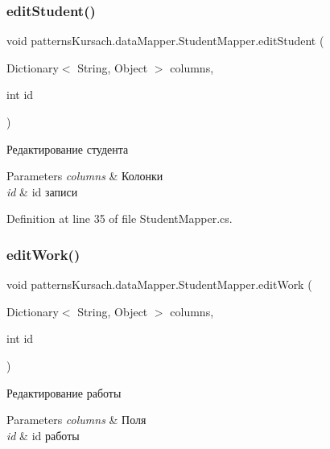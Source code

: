 \subsubsection{\texorpdfstring{edit\+Student()}{editStudent()}}
{\footnotesize\ttfamily void patterns\+Kursach.\+data\+Mapper.\+Student\+Mapper.\+edit\+Student (\begin{DoxyParamCaption}\item[{Dictionary$<$ String, Object $>$}]{columns,  }\item[{int}]{id }\end{DoxyParamCaption})}



Редактирование студента 


\begin{DoxyParams}{Parameters}
{\em columns} & Колонки\\
\hline
{\em id} & id записи\\
\hline
\end{DoxyParams}


Definition at line 35 of file Student\+Mapper.\+cs.

\mbox{\label{classpatterns_kursach_1_1data_mapper_1_1_student_mapper_ab960f10607151d2e1977da75acfcf623}} 
\subsubsection{\texorpdfstring{edit\+Work()}{editWork()}}
{\footnotesize\ttfamily void patterns\+Kursach.\+data\+Mapper.\+Student\+Mapper.\+edit\+Work (\begin{DoxyParamCaption}\item[{Dictionary$<$ String, Object $>$}]{columns,  }\item[{int}]{id }\end{DoxyParamCaption})}



Редактирование работы 


\begin{DoxyParams}{Parameters}
{\em columns} & Поля\\
\hline
{\em id} & id работы\\
\hline
\end{DoxyParams}


